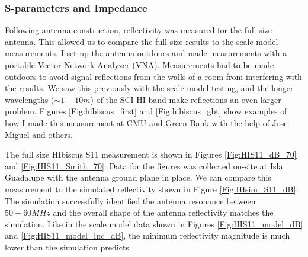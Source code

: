 \subsubsection{S-parameters and Impedance}\label{Sec:HIbiscus_Imp}

Following antenna construction, reflectivity was measured for the full size antenna. This allowed us to compare the full size results to the scale model measurements. I set up the antenna outdoors and made measurements with a portable Vector Network Analyzer (VNA). Measurements had to be made outdoors to avoid signal reflections from the walls of a room from interfering with the results. We saw this previously with the scale model testing, and the longer wavelengths ($\sim 1-10 m$) of the SCI-HI band make reflections an even larger problem. Figures \ref{Fig:hibiscus_first} and \ref{Fig:hibiscus_gbt} show examples of how I made this measurement at CMU and Green Bank with the help of Jose-Miguel and others.

The full size HIbiscus S11 measurement is shown in Figures \ref{Fig:HIS11_dB_70} and \ref{Fig:HIS11_Smith_70}. Data for the figures was collected on-site at Isla Guadalupe with the antenna ground plane in place. We can compare this measurement to the simulated reflectivity shown in Figure \ref{Fig:HIsim_S11_dB}. The simulation successfully identified the antenna resonance between $50-60 MHz$ and the overall shape of the antenna reflectivity matches the simulation. Like in the scale model data shown in Figures \ref{Fig:HIS11_model_dB} and \ref{Fig:HIS11_model_inc_dB}, the minimum reflectivity magnitude is much lower than the simulation predicts. 


